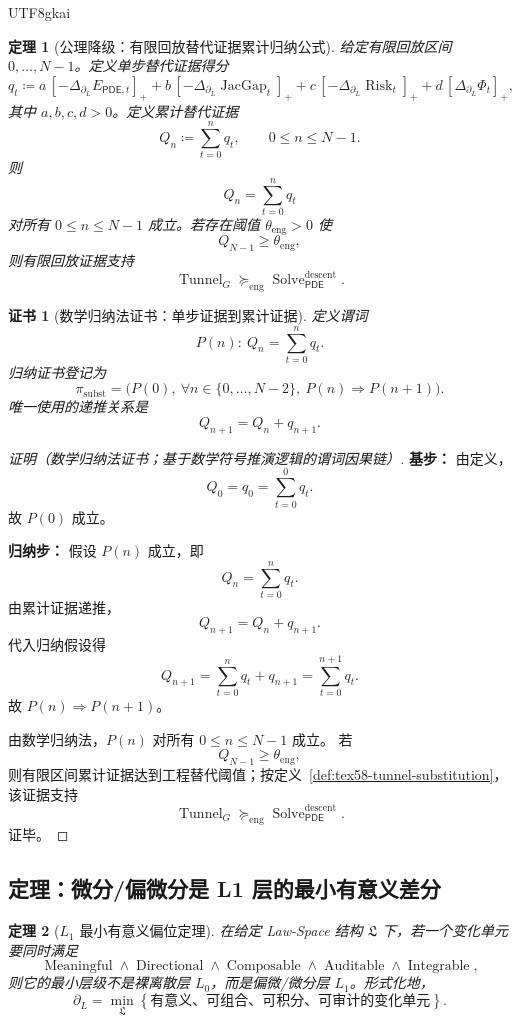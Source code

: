 \documentclass[12pt]{article}
\newtheorem{theorem}{定理}[section]
\newtheorem{Certificate}{证书}[section]
\newcommand{\DefEq}{\coloneqq}
\newcommand{\PDE}{\ensuremath{\mathsf{PDE}}}
\DeclareMathOperator{\JacGap}{JacGap}
\DeclareMathOperator{\Risk}{Risk}
\DeclareMathOperator{\Tunnel}{Tunnel}
\DeclareMathOperator{\Solve}{Solve}
\DeclareMathOperator{\Meaningful}{Meaningful}
\DeclareMathOperator{\Directional}{Directional}
\DeclareMathOperator{\Composable}{Composable}
\DeclareMathOperator{\Auditable}{Auditable}
\DeclareMathOperator{\Integrable}{Integrable}
\begin{document}
\begin{CJK*}{UTF8}{gkai}
\begin{theorem}[公理降级：有限回放替代证据累计归纳公式]
\label{thm:tex58-substitution-induction}
给定有限回放区间 \(0,\ldots,N-1\)。定义单步替代证据得分
\[
  q_t
  \DefEq
  a\,[-\Delta_{\partial_L}E_{\PDE,t}]_+
  +
  b\,[-\Delta_{\partial_L}\JacGap_t]_+
  +
  c\,[-\Delta_{\partial_L}\Risk_t]_+
  +
  d\,[\Delta_{\partial_L}\Phi_t]_+,
\]
其中 \(a,b,c,d>0\)。定义累计替代证据
\[
  Q_n
  \DefEq
  \sum_{t=0}^{n}q_t,
  \qquad 0\le n\le N-1.
\]
则
\[
  Q_n=\sum_{t=0}^{n}q_t
\]
对所有 \(0\le n\le N-1\) 成立。若存在阈值 \(\theta_{\mathrm{eng}}>0\) 使
\[
  Q_{N-1}\ge\theta_{\mathrm{eng}},
\]
则有限回放证据支持
\[
  \Tunnel_G\succcurlyeq_{\mathrm{eng}}\Solve_{\PDE}^{\mathrm{descent}}.
\]
\end{theorem}

\begin{Certificate}[数学归纳法证书：单步证据到累计证据]
\label{cert:tex58-substitution-induction}
定义谓词
\[
  P(n):\ Q_n=\sum_{t=0}^{n}q_t.
\]
归纳证书登记为
\[
  \pi_{\mathrm{subst}}
  =
  \bigl(P(0),\ \forall n\in\{0,\ldots,N-2\},\ P(n)\Rightarrow P(n+1)\bigr).
\]
唯一使用的递推关系是
\[
  Q_{n+1}=Q_n+q_{n+1}.
\]
\end{Certificate}

\begin{proof}[证明（数学归纳法证书；基于数学符号推演逻辑的谓词因果链）]
\textbf{基步：}
由定义，
\[
  Q_0=q_0=\sum_{t=0}^{0}q_t.
\]
故 \(P(0)\) 成立。

\textbf{归纳步：}
假设 \(P(n)\) 成立，即
\[
  Q_n=\sum_{t=0}^{n}q_t.
\]
由累计证据递推，
\[
  Q_{n+1}=Q_n+q_{n+1}.
\]
代入归纳假设得
\[
  Q_{n+1}
  =
  \sum_{t=0}^{n}q_t+q_{n+1}
  =
  \sum_{t=0}^{n+1}q_t.
\]
故 \(P(n)\Rightarrow P(n+1)\)。

由数学归纳法，\(P(n)\) 对所有 \(0\le n\le N-1\) 成立。
若
\[
  Q_{N-1}\ge\theta_{\mathrm{eng}},
\]
则有限区间累计证据达到工程替代阈值；按定义~\ref{def:tex58-tunnel-substitution}，
该证据支持
\[
  \Tunnel_G\succcurlyeq_{\mathrm{eng}}\Solve_{\PDE}^{\mathrm{descent}}.
\]
证毕。
\end{proof}

\subsection{定理：微分/偏微分是 L1 层的最小有意义差分}
\label{subsec:tex58-l1-minimal-meaningful-difference}

\begin{theorem}[\(L_1\) 最小有意义偏位定理]
\label{thm:tex58-l1-minimal-meaningful}
在给定 Law-Space 结构 \(\mathfrak L\) 下，若一个变化单元要同时满足
\[
  \Meaningful
  \wedge
  \Directional
  \wedge
  \Composable
  \wedge
  \Auditable
  \wedge
  \Integrable,
\]
则它的最小层级不是裸离散层 \(L_0\)，而是偏微/微分层 \(L_1\)。形式化地，
\[
  \boxed{
  \partial_L
  =
  \min_{\mathfrak L}
  \left\{
  \text{有意义、可组合、可积分、可审计的变化单元}
  \right\}.
  }
\]
\end{theorem}


\end{CJK*}
\end{document}
